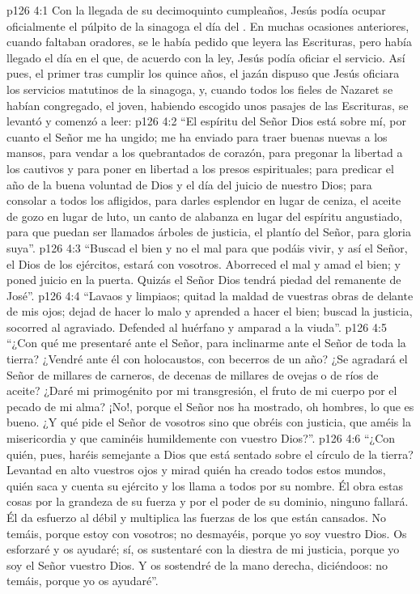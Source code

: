 \vs p126 4:1 Con la llegada de su decimoquinto cumpleaños, Jesús podía ocupar oficialmente el púlpito de la sinagoga el día del . En muchas ocasiones anteriores, cuando faltaban oradores, se le había pedido que leyera las Escrituras, pero había llegado el día en el que, de acuerdo con la ley, Jesús podía oficiar el servicio. Así pues, el primer  tras cumplir los quince años, el jazán dispuso que Jesús oficiara los servicios matutinos de la sinagoga, y, cuando todos los fieles de Nazaret se habían congregado, el joven, habiendo escogido unos pasajes de las Escrituras, se levantó y comenzó a leer:
\vs p126 4:2 \pc “El espíritu del Señor Dios está sobre mí, por cuanto el Señor me ha ungido; me ha enviado para traer buenas nuevas a los mansos, para vendar a los quebrantados de corazón, para pregonar la libertad a los cautivos y para poner en libertad a los presos espirituales; para predicar el año de la buena voluntad de Dios y el día del juicio de nuestro Dios; para consolar a todos los afligidos, para darles esplendor en lugar de ceniza, el aceite de gozo en lugar de luto, un canto de alabanza en lugar del espíritu angustiado, para que puedan ser llamados árboles de justicia, el plantío del Señor, para gloria suya”.
\vs p126 4:3 “Buscad el bien y no el mal para que podáis vivir, y así el Señor, el Dios de los ejércitos, estará con vosotros. Aborreced el mal y amad el bien; y poned juicio en la puerta. Quizás el Señor Dios tendrá piedad del remanente de José”.
\vs p126 4:4 “Lavaos y limpiaos; quitad la maldad de vuestras obras de delante de mis ojos; dejad de hacer lo malo y aprended a hacer el bien; buscad la justicia, socorred al agraviado. Defended al huérfano y amparad a la viuda”.
\vs p126 4:5 “¿Con qué me presentaré ante el Señor, para inclinarme ante el Señor de toda la tierra? ¿Vendré ante él con holocaustos, con becerros de un año? ¿Se agradará el Señor de millares de carneros, de decenas de millares de ovejas o de ríos de aceite? ¿Daré mi primogénito por mi transgresión, el fruto de mi cuerpo por el pecado de mi alma? ¡No!, porque el Señor nos ha mostrado, oh hombres, lo que es bueno. ¿Y qué pide el Señor de vosotros sino que obréis con justicia, que améis la misericordia y que caminéis humildemente con vuestro Dios?”.
\vs p126 4:6 “¿Con quién, pues, haréis semejante a Dios que está sentado sobre el círculo de la tierra? Levantad en alto vuestros ojos y mirad quién ha creado todos estos mundos, quién saca y cuenta su ejército y los llama a todos por su nombre. Él obra estas cosas por la grandeza de su fuerza y por el poder de su dominio, ninguno fallará. Él da esfuerzo al débil y multiplica las fuerzas de los que están cansados. No temáis, porque estoy con vosotros; no desmayéis, porque yo soy vuestro Dios. Os esforzaré y os ayudaré; sí, os sustentaré con la diestra de mi justicia, porque yo soy el Señor vuestro Dios. Y os sostendré de la mano derecha, diciéndoos: no temáis, porque yo os ayudaré”.
